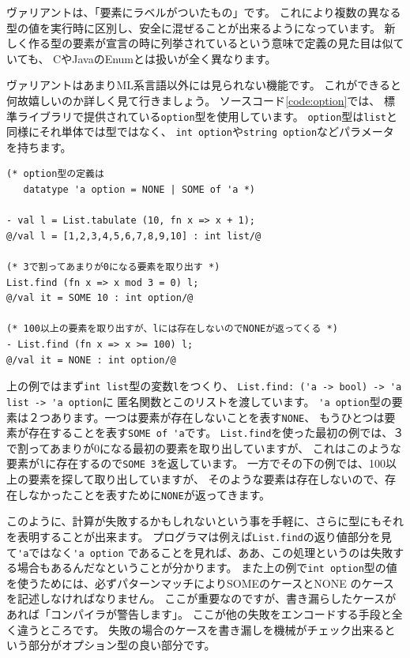 \documentclass[11pt,a4paper]{article}
\begin{document}
ヴァリアントは、「要素にラベルがついたもの」です。
これにより複数の異なる型の値を実行時に区別し、安全に混ぜることが出来るようになっています。
新しく作る型の要素が宣言の時に列挙されているという意味で定義の見た目は似ていても、
CやJavaのEnumとは扱いが全く異なります。

ヴァリアントはあまりML系言語以外には見られない機能です。
これができると何故嬉しいのか詳しく見て行きましょう。
ソースコード\ref{code:option}では、
標準ライブラリで提供されている\lstinline{option}型を使用しています。
\lstinline{option}型は\lstinline{list}と同様にそれ単体では型ではなく、
\lstinline{int option}や\lstinline{string option}などパラメータを持ちます。

\begin{lstlisting}[caption=オプション型,label=code:option]
(* option型の定義は
   datatype 'a option = NONE | SOME of 'a *)

- val l = List.tabulate (10, fn x => x + 1);
@/val l = [1,2,3,4,5,6,7,8,9,10] : int list/@

(* 3で割ってあまりが0になる要素を取り出す *)
List.find (fn x => x mod 3 = 0) l;
@/val it = SOME 10 : int option/@

(* 100以上の要素を取り出すが、lには存在しないのでNONEが返ってくる *)
- List.find (fn x => x >= 100) l;
@/val it = NONE : int option/@
\end{lstlisting}

上の例ではまず\lstinline{int list}型の変数\lstinline{l}をつくり、
\lstinline{List.find: ('a -> bool) -> 'a list -> 'a option}に
匿名関数とこのリストを渡しています。
\lstinline{'a option}型の要素は２つあります。一つは要素が存在しないことを表す\lstinline{NONE}、
もうひとつは要素が存在することを表す\lstinline{SOME of 'a}です。
\lstinline{List.find}を使った最初の例では、３で割ってあまりが0になる最初の要素を取り出していますが、
これはこのような要素が\lstinline{l}に存在するので\lstinline{SOME 3}を返しています。
一方でその下の例では、100以上の要素を探して取り出していますが、
そのような要素は存在しないので、存在しなかったことを表すために\lstinline{NONE}が返ってきます。

このように、計算が失敗するかもしれないという事を手軽に、さらに型にもそれを表明することが出来ます。
プログラマは例えば\lstinline{List.find}の返り値部分を見て\lstinline{'a}ではなく\lstinline{'a option}
であることを見れば、ああ、この処理というのは失敗する場合もあるんだなということが分かります。
また上の例で\lstinline{int option}型の値を使うためには、必ずパターンマッチによりSOMEのケースとNONE
のケースを記述しなければなりません。
ここが重要なのですが、書き漏らしたケースがあれば「コンパイラが警告します」。
ここが他の失敗をエンコードする手段と全く違うところです。
失敗の場合のケースを書き漏しを機械がチェック出来るという部分がオプション型の良い部分です。
\end{document}
